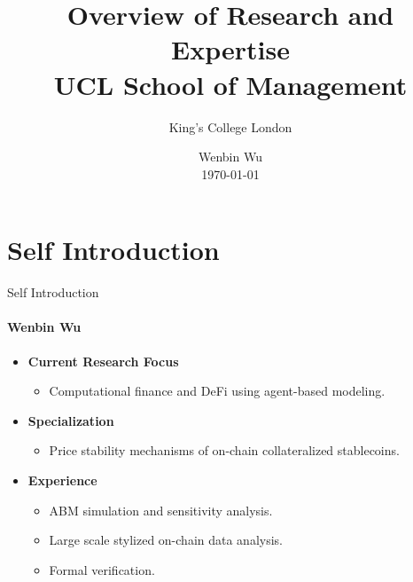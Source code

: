 \documentclass{beamer}
\title{Overview of Research and Expertise\\
UCL School of Management
}
\subtitle{King's College London}
\author{Wenbin Wu\\ \today}
\begin{document}
\shorthandoff{-}
\frame[c]{\maketitle}


\section{Self Introduction}

\begin{frame}{Self Introduction}
\framesubtitle{Wenbin Wu}
    \begin{itemize}
        \item \textbf{Current Research Focus}
        \begin{itemize}
            \item Computational finance and DeFi using agent-based modeling.
        \end{itemize}

        \item \textbf{Specialization}
        \begin{itemize}
            \item Price stability mechanisms of on-chain collateralized stablecoins.
        \end{itemize}

        \item \textbf{Experience}
        \begin{itemize}
            \item ABM simulation and sensitivity analysis. 
            \item Large scale stylized on-chain data analysis.
            \item Formal verification.
        \end{itemize}
    \end{itemize}
\end{frame}
\end{document}
